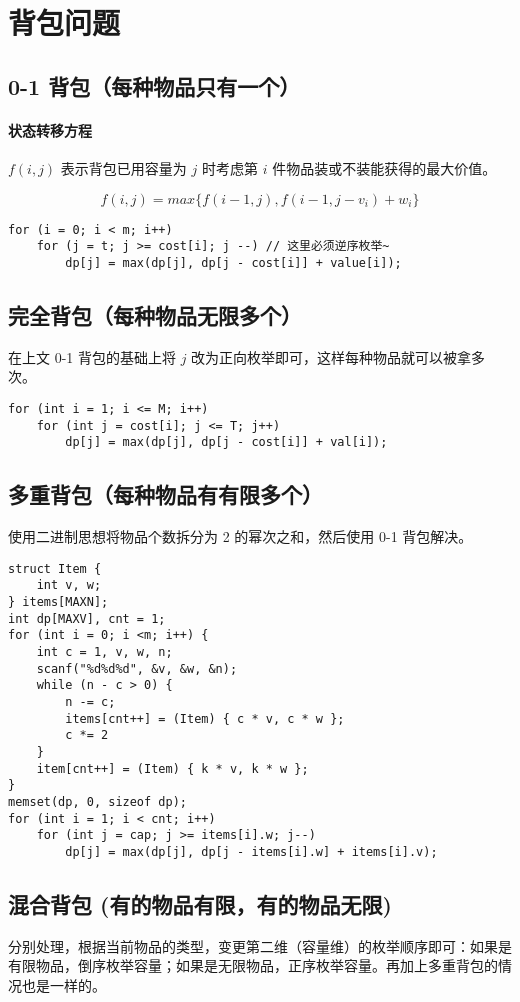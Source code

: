 \section{背包问题}

\subsection{0-1 背包（每种物品只有一个）}
\paragraph{状态转移方程} $f(i, j)$ 表示背包已用容量为 $j$ 时考虑第 $i$ 件物品装或不装能获得的最大价值。

$$f(i, j) = max\{f(i-1, j), f(i-1, j - v_i) +w_i\}$$

\begin{verbatim}
for (i = 0; i < m; i++)
    for (j = t; j >= cost[i]; j --) // 这里必须逆序枚举~
        dp[j] = max(dp[j], dp[j - cost[i]] + value[i]);
\end{verbatim}

\subsection{完全背包（每种物品无限多个）}
在上文 0-1 背包的基础上将 $j$ 改为正向枚举即可，这样每种物品就可以被拿多次。
\begin{verbatim}
for (int i = 1; i <= M; i++)
    for (int j = cost[i]; j <= T; j++)
        dp[j] = max(dp[j], dp[j - cost[i]] + val[i]);
\end{verbatim}

\subsection{多重背包（每种物品有有限多个）}
使用二进制思想将物品个数拆分为 2 的幂次之和，然后使用 0-1 背包解决。
\begin{verbatim}
struct Item {
    int v, w;
} items[MAXN];
int dp[MAXV], cnt = 1;
for (int i = 0; i <m; i++) {
    int c = 1, v, w, n;
    scanf("%d%d%d", &v, &w, &n);
    while (n - c > 0) {
        n -= c;
        items[cnt++] = (Item) { c * v, c * w };
        c *= 2
    }
    item[cnt++] = (Item) { k * v, k * w };
}
memset(dp, 0, sizeof dp);
for (int i = 1; i < cnt; i++)
    for (int j = cap; j >= items[i].w; j--)
        dp[j] = max(dp[j], dp[j - items[i].w] + items[i].v);
\end{verbatim}

\subsection{混合背包 (有的物品有限，有的物品无限)}
分别处理，根据当前物品的类型，变更第二维（容量维）的枚举顺序即可：如果是有限物品，倒序枚举容量；如果是无限物品，正序枚举容量。再加上多重背包的情况也是一样的。

